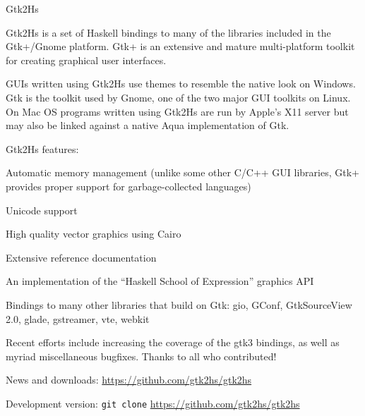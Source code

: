 \begin{hcarentry}{Gtk2Hs}
\label{gtk2hs}
\makeheader

Gtk2Hs is a set of Haskell bindings to many of the libraries included
in the Gtk+/Gnome platform. Gtk+ is an extensive and mature
multi-platform toolkit for creating graphical user interfaces.

GUIs written using Gtk2Hs use themes to resemble the native look on
Windows. Gtk is the toolkit used by Gnome, one of the two major GUI toolkits
on Linux. On Mac OS programs written using Gtk2Hs are run by Apple's
X11 server but may also be linked against a native Aqua implementation
of Gtk.

\Separate
Gtk2Hs features:
\begin{compactitem}
\item Automatic memory management (unlike some other C/C++ GUI
libraries, Gtk+ provides proper support for garbage-collected languages)
\item Unicode support
\item High quality vector graphics using Cairo
\item Extensive reference documentation
\item An implementation of the ``Haskell School of Expression'' graphics
API
\item Bindings to many other libraries that build on Gtk: gio, GConf,
  GtkSourceView 2.0, glade, gstreamer, vte, webkit
\end{compactitem}

\Separate

Recent efforts include increasing the coverage of the gtk3 bindings, as well
as myriad miscellaneous bugfixes. Thanks to all who contributed!

\FurtherReading
\begin{compactitem}
\item News and downloads:
  \url{https://github.com/gtk2hs/gtk2hs}

\item Development version:
  \texttt{git clone} \url{https://github.com/gtk2hs/gtk2hs}
\end{compactitem}
\end{hcarentry} 
